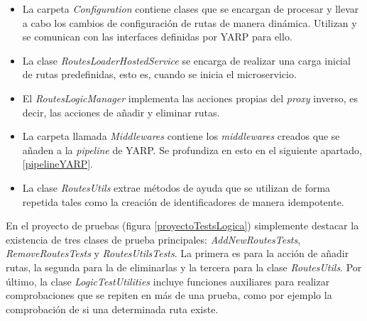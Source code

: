 \documentclass[11pt,spanish,listoffigures]{tfgetsinf}
\begin{document}
\begin{itemize}

	\item La carpeta \emph{Configuration} contiene clases que se encargan de procesar y llevar a cabo los cambios de configuración de rutas de manera dinámica. Utilizan y se comunican con las interfaces definidas por YARP para ello.

	\item La clase \emph{RoutesLoaderHostedService} se encarga de realizar una carga inicial de rutas predefinidas, esto es, cuando se inicia el microservicio.

	\item El \emph{RoutesLogicManager} implementa las acciones propias del \emph{proxy} inverso, es decir, las acciones de añadir y eliminar rutas.

	\item La carpeta llamada \emph{Middlewares} contiene los \emph{middlewares} creados que se añaden a la \emph{pipeline} de YARP. Se profundiza en esto en el siguiente apartado, \ref{pipelineYARP}.

	\item La clase \emph{RoutesUtils} extrae métodos de ayuda que se utilizan de forma repetida tales como la creación de identificadores de manera idempotente.

\end{itemize}

En el proyecto de pruebas (figura \ref{proyectoTestsLogica}) simplemente destacar la existencia de tres clases de prueba principales: \emph{AddNewRoutesTests}, \emph{RemoveRoutesTests} y \emph{RoutesUtilsTests}. La primera es para la acción de añadir rutas, la segunda para la de eliminarlas y la tercera para la clase \emph{RoutesUtils}. Por último, la clase \emph{LogicTestUtilities} incluye funciones auxiliares para realizar comprobaciones que se repiten en más de una prueba, como por ejemplo la comprobación de si una determinada ruta existe.
\end{document}
